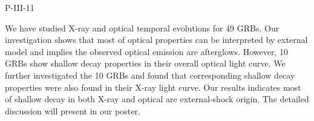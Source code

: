 P-III-11


\bigskip



\bigskip

\noindent We have studied X-ray and optical temporal evolutions for 49 GRBs. Our investigation shows that most of optical properties can be interpreted by external model and implies the observed optical emission are afterglows. However, 10 GRBs show shallow decay properties in their overall optical light curve. We further investigated  the 10 GRBs and found that corresponding shallow decay properties were also found in their X-ray light curve. Our results indicates most of shallow decay in both X-ray and optical are external-shock origin. The detailed discussion will present in our poster.

